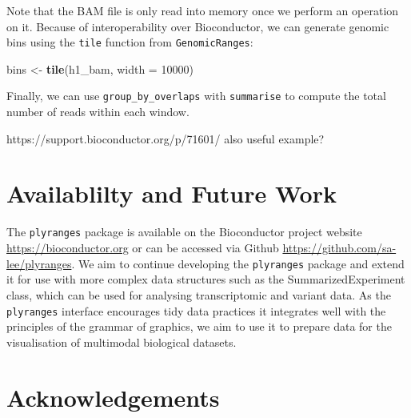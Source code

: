 \documentclass[10pt,letterpaper]{article}
\newenvironment{Shaded}{\begin{snugshade}}{\end{snugshade}}
\newcommand{\KeywordTok}[1]{\textcolor[rgb]{0.13,0.29,0.53}{\textbf{#1}}}
\newcommand{\DataTypeTok}[1]{\textcolor[rgb]{0.13,0.29,0.53}{#1}}
\newcommand{\DecValTok}[1]{\textcolor[rgb]{0.00,0.00,0.81}{#1}}
\newcommand{\StringTok}[1]{\textcolor[rgb]{0.31,0.60,0.02}{#1}}
\newcommand{\OperatorTok}[1]{\textcolor[rgb]{0.81,0.36,0.00}{\textbf{#1}}}
\newcommand{\NormalTok}[1]{#1}
\begin{document}
Note that the BAM file is only read into memory once we perform an
operation on it. Because of interoperability over Bioconductor, we can
generate genomic bins using the \texttt{tile} function from
\texttt{GenomicRanges}:

\begin{Shaded}
\begin{Highlighting}[]
\NormalTok{bins <-}\StringTok{ }\KeywordTok{tile}\NormalTok{(h1_bam, }\DataTypeTok{width =} \DecValTok{10000}\NormalTok{)}
\end{Highlighting}
\end{Shaded}

Finally, we can use \texttt{group\_by\_overlaps} with \texttt{summarise}
to compute the total number of reads within each window.

\begin{Shaded}
\end{Shaded}

https://support.bioconductor.org/p/71601/ also useful example?

\section{Availablilty and Future
Work}\label{availablilty-and-future-work}

The \texttt{plyranges} package is available on the Bioconductor project
website \url{https://bioconductor.org} or can be accessed via Github
\url{https://github.com/sa-lee/plyranges}. We aim to continue developing
the \texttt{plyranges} package and extend it for use with more complex
data structures such as the SummarizedExperiment class, which can be
used for analysing transcriptomic and variant data. As the
\texttt{plyranges} interface encourages tidy data practices it
integrates well with the principles of the grammar of graphics, we aim
to use it to prepare data for the visualisation of multimodal biological
datasets.

\section{Acknowledgements}\label{acknowledgements}
\end{document}
